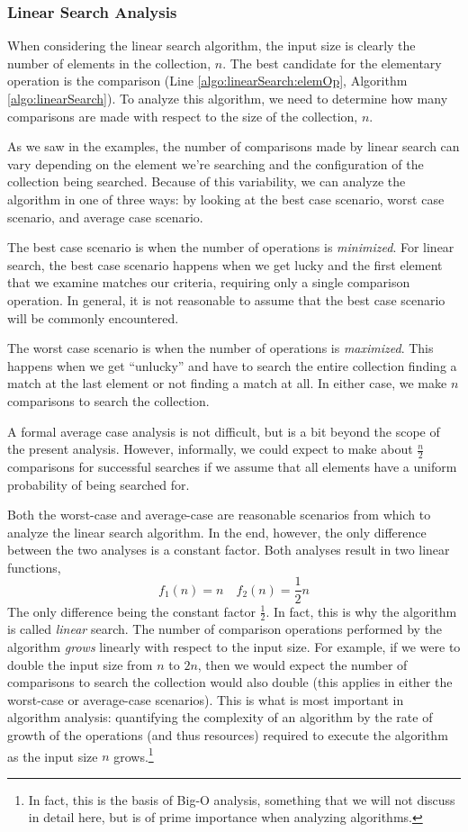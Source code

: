 \subsubsection{Linear Search Analysis}

When considering the linear search algorithm, the input size is clearly the
number of elements in the collection, $n$.  The best candidate for the
elementary operation is the comparison (Line \ref{algo:linearSearch:elemOp}, 
Algorithm \ref{algo:linearSearch}).  To analyze this algorithm, we need
to determine how many comparisons are made with respect to the size of
the collection, $n$.

As we saw in the examples, the number of comparisons made by linear search
can vary depending on the element we're searching and the configuration of
the collection being searched.  Because of this variability, we can 
analyze the algorithm in one of three ways: by looking at the best case
scenario, worst case scenario, and average case scenario.

The best case scenario is when the number of operations is \emph{minimized}.
For linear search, the best case scenario happens when we get lucky and
the first element that we examine matches our criteria, requiring only a 
single comparison operation.  In general, it is not reasonable to assume
that the best case scenario will be commonly encountered.

The worst case scenario is when the number of operations is \emph{maximized}.
This happens when we get ``unlucky'' and have to search the entire collection
finding a match at the last element or not finding a match at all.  In either
case, we make $n$ comparisons to search the collection.

A formal average case analysis is not difficult, but is a bit beyond the
scope of the present analysis.  However, informally, we could expect to make
about $\frac{n}{2}$ comparisons for successful searches if we assume that
all elements have a uniform probability of being searched for.

Both the worst-case and average-case are reasonable scenarios from which to
analyze the linear search algorithm.  In the end, however, the only difference
between the two analyses is a constant factor.  Both analyses result in two
linear functions, 
  $$f_1(n) = n \quad f_2(n) = \frac{1}{2}n$$
The only difference being the constant factor $\frac{1}{2}$.  In fact, this
is why the algorithm is called \emph{linear} search.  The number of comparison
operations performed by the algorithm \emph{grows} linearly with respect
to the input size.  For example, if we were to double the input size from
$n$ to $2n$, then we would expect the number of comparisons to search the
collection would also double (this applies in either the worst-case or average-case
scenarios).  This is what is most important in algorithm analysis: quantifying
the complexity of an algorithm by the rate of growth of the operations (and
thus resources) required to execute the algorithm as the input size $n$ 
grows.\footnote{In fact, this is the basis of Big-O analysis, something that 
we will not discuss in detail here, but is of prime importance when analyzing
algorithms.}

